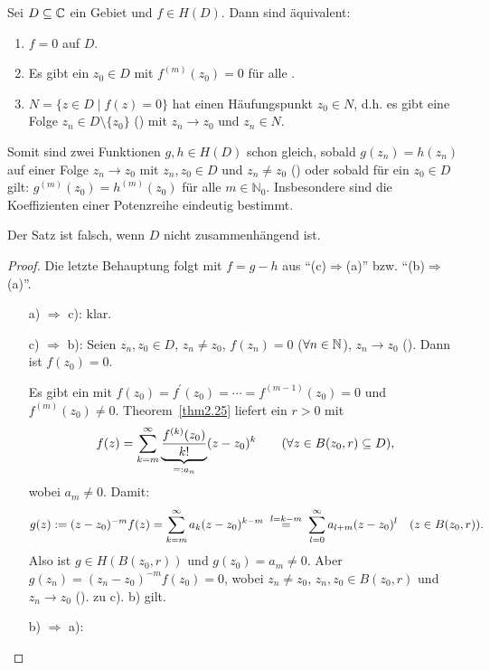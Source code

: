 \documentclass[a4paper,twoside,DIV15,BCOR12mm]{scrbook}
\begin{document}
\begin{thm}[Identitätssatz]\label{thm2.35}
  Sei $D\subseteq\mathbb{C}$ ein Gebiet und $f\in H(D)$. Dann sind äquivalent:
  \begin{enumerate}
  \item $f=0$ auf $D$.
  \item Es gibt ein $z_0\in D$ mit $f^{(m)}(z_0)=0$ für alle .
  \item $N=\{ z\in D \mid f(z)=0 \}$ hat einen Häufungspunkt $z_0\in N$, d.h. es gibt eine Folge $z_n\in D\setminus\{z_0\}$
    () mit $z_n\to z_0$ und $z_n\in N$.
  \end{enumerate}
  Somit sind zwei Funktionen $g,h\in H(D)$ schon gleich, sobald $g(z_n)=h(z_n)$ auf einer Folge $z_n\to z_0$ mit $z_n,z_0\in D$
  und $z_n\neq z_0$ () oder sobald für ein $z_0\in D$ gilt: $g^{(m)}(z_0)=h^{(m)}(z_0)$ für alle
  $m\in\mathbb{N}_0$. Insbesondere sind die Koeffizienten einer Potenzreihe eindeutig bestimmt.
\end{thm}
\begin{bem*}
  Der Satz ist falsch, wenn $D$ nicht zusammenhängend ist.
\end{bem*}
\begin{proof}
  Die letzte Behauptung folgt mit $f=g-h$ aus "`(c)$\Rightarrow$(a)"' bzw. "`(b)$\Rightarrow$(a)"'.
  \begin{enumerate}
  \item[a)]$\!\Rightarrow$ c): klar.
  \item[c)]$\!\Rightarrow$ b): Seien $z_n,z_0\in D$, $z_n\neq z_0$, $f(z_n)=0$ ($\forall n\in\mathbb{N}$), $z_n\to z_0$ (\ninf). Dann
    ist $f(z_0) = 0$.

    \ann Es gibt ein  mit $f(z_0)=f^\prime(z_0)=\dotsb=f^{(m-1)}(z_0)=0$ und $f^{(m)}(z_0)\neq0$. Theorem~\ref{thm2.25}
    liefert ein $r>0$ mit
    \[ f(z)=\sum_{k=m}^\infty{\underbrace{\frac{f^{(k)}(z_0)}{k!}}_{=:a_n}(z-z_0)^k}\qquad(\forall z\in B(z_0,r)\subseteq D),\]
    wobei $a_m\neq0$. Damit:
    \[ g(z) \da (z-z_0)^{-m}f(z) = \sum_{k=m}^\infty{a_k(z-z_0)^{k-m}} \wegen{=}{l=k-m} \sum_{l=0}^\infty{a_{l+m}(z-z_0)^l}
    \quad (z\in B(z_0,r)).\]
    Also ist $g\in H(B(z_0,r))$ und $g(z_0)=a_m\neq0$. Aber $g(z_n)=(z_n-z_0)^{-m}f(z_0)=0$, wobei $z_n\neq z_0$, $z_n,z_0\in
    B(z_0,r)$ und $z_n\to z_0$ (\ninf). \ws zu c). \folgt b) gilt.
  \item[b)]$\!\Rightarrow$ a): \qedhere
  \end{enumerate}
\end{proof}
\end{document}
